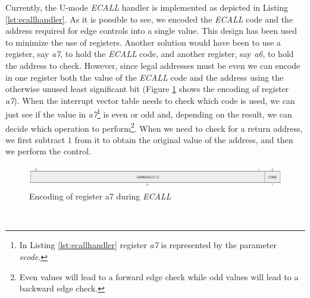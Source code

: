 Currently, the U-mode \textit{ECALL} handler is implemented as depicted in
Listing \ref{lst:ecallhandler}. As it is possible to see, we encoded the \textit{ECALL}
code and the address required for edge controls into a single value. This design
has been used to minimize the use of registers. Another solution would have been
to use a register, say \textit{a7}, to hold the \textit{ECALL} code, and another
register, say \textit{a6}, to hold the address to check. However, since legal addresses
must be even we can encode in one register both the value of the \textit{ECALL}
code and the address using the otherwise unused least significant bit (Figure \ref{fig:ecall}
shows the encoding of register \textit{a7}). When the interrupt vector table
needs to check which code is used, we can just see if the value in \textit{a7}\footnote{In
Listing \ref{lst:ecallhandler} register \textit{a7} is represented by the parameter
\textit{ecode}.} is even or odd and, depending on the result, we can decide which
operation to perform\footnote{Even values will lead to a forward edge check
while odd values will lead to a backward edge check.}. When we need to check for
a return address, we first subtract $1$ from it to obtain the original value of
the address, and then we perform the control. \\
\begin{figure}[htbp]
  \centering
  \includegraphics[width=.9\linewidth]{images/ecall_code.png}
  \caption{Encoding of register a7 during \textit{ECALL}}
  \label{fig:ecall}
\end{figure}
\\

